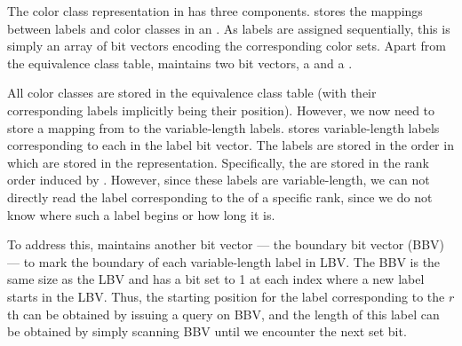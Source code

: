 
The color class representation in \system has three components. \system stores
the mappings between labels and color classes in an . As labels are assigned sequentially, this is simply an array of
bit vectors encoding the corresponding color sets. Apart from the equivalence
class table, \system maintains two bit vectors, a  and a .

All color classes are stored in the equivalence class table (with their
corresponding labels implicitly being their position). However, we now need to
store a mapping from \kmers to the variable-length labels. \system stores
variable-length labels corresponding to each \kmer in the label bit vector. The
labels are stored in the order in which \kmers are stored in the \dbg
representation. Specifically, the \kmers are stored in the rank order induced by
\boss. However, since these labels are variable-length, we can not directly read
the label corresponding to the \kmer of a specific rank, since we do not know
where such a label begins or how long it is.

To address this, \system maintains another bit vector --- the boundary bit
vector (BBV) --- to mark the boundary of each variable-length label in LBV. The
BBV is the same size as the LBV and has a bit set
to 1 at each index where a new label starts in the LBV. Thus, the starting
position for the label corresponding to the $r$th \kmer can be obtained by
issuing a  query on BBV, and the length of this label can be
obtained by simply scanning BBV until we encounter the next set bit.

